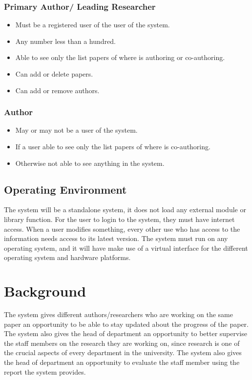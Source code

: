 \documentclass[a4paper,12pt]{report}
\begin{document}
\subsubsection{Primary Author/ Leading Researcher}
	\begin{itemize}
		\item Must be a registered user of the user of the system.
		\item Any number less than a hundred.
		\item Able to see only the list papers of where is authoring or co-authoring.
		\item Can add or delete papers.
		\item Can add or remove authors.
	\end{itemize}

\subsubsection{Author}
	\begin{itemize}
		\item May or may not be a user of the system.
		\item If a user able to see only the list papers of where is co-authoring.
		\item Otherwise not able to see anything in the system.
	\end{itemize}

\subsection{Operating Environment}
The system will be a standalone system, it does not load any external module or library function. For the user to login to the system, they must have internet access. When a user modifies something, every other use who has access to the information needs access to its latest version. The system must run on any operating system, and it will have make use of a virtual interface for the different operating system and hardware platforms.

\newpage
\section{Background}
The system gives different authors/researchers who are working on the same paper an opportunity to be able to stay updated about the progress of the paper. The system also gives the head of department an opportunity to better supervise the staff members on the research  they are working on, since research is one of the crucial aspects of every department in the university. The system also gives the head of department an opportunity to evaluate the staff member using the report the system provides.
\end{document}
